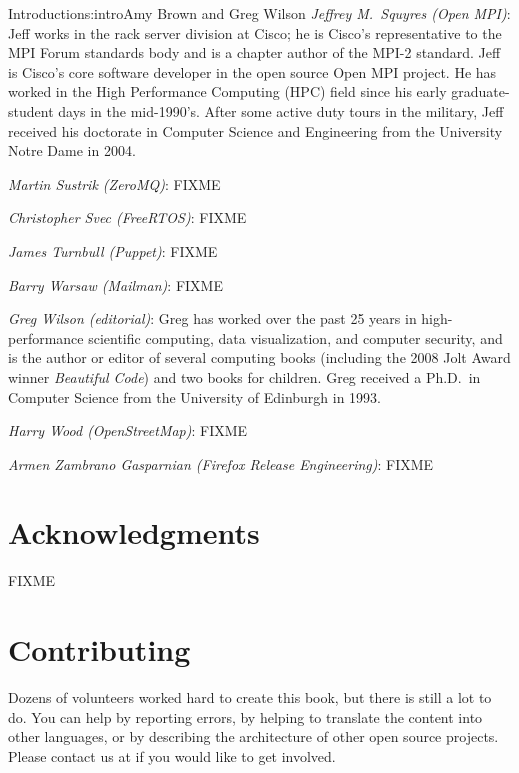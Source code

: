 \begin{aosachapter}{Introduction}{s:intro}{Amy Brown and Greg Wilson}
\emph{Jeffrey M.\ Squyres (Open MPI)}: Jeff works in the rack server
division at Cisco; he is Cisco's representative to the MPI Forum
standards body and is a chapter author of the MPI-2 standard.  Jeff is
Cisco's core software developer in the open source Open MPI project.
He has worked in the High Performance Computing (HPC) field since his
early graduate-student days in the mid-1990's.  After some active duty
tours in the military, Jeff received his doctorate in Computer Science
and Engineering from the University Notre Dame in 2004.

\emph{Martin Sustrik (ZeroMQ)}: FIXME

\emph{Christopher Svec (FreeRTOS)}: FIXME

\emph{James Turnbull (Puppet)}: FIXME

\emph{Barry Warsaw (Mailman)}: FIXME

\emph{Greg Wilson (editorial)}: Greg has worked over the past 25 years
in high-performance scientific computing, data visualization, and
computer security, and is the author or editor of several computing
books (including the 2008 Jolt Award winner \emph{Beautiful Code}) and
two books for children.  Greg received a Ph.D.\ in Computer Science
from the University of Edinburgh in 1993.

\emph{Harry Wood (OpenStreetMap)}: FIXME

\emph{Armen Zambrano Gasparnian (Firefox Release Engineering)}: FIXME

\section*{Acknowledgments}

FIXME

\section*{Contributing}

Dozens of volunteers worked hard to create this book, but there is
still a lot to do.  You can help by reporting errors, by helping to
translate the content into other languages, or by describing the
architecture of other open source projects.  Please contact us at
 if you would like to get involved.

\end{aosachapter}
